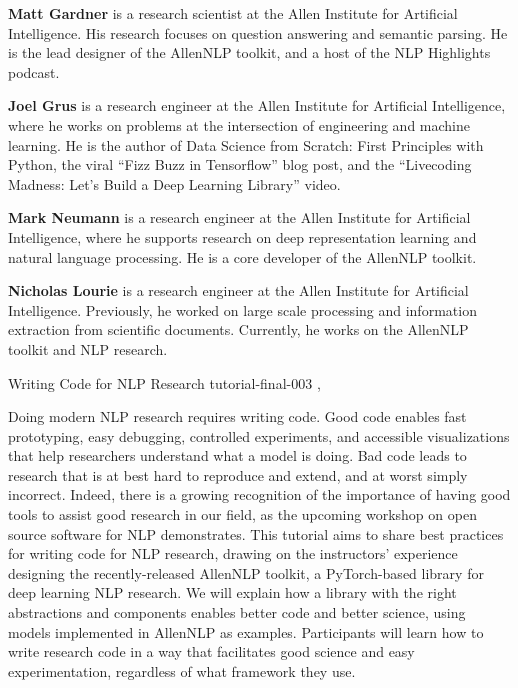 \begin{bio}
\textbf{Matt Gardner} is a research scientist at the Allen
Institute for Artificial Intelligence. His research
focuses on question answering and semantic parsing.
He is the lead designer of the AllenNLP
toolkit, and a host of the NLP Highlights podcast.

\textbf{Joel Grus} is a research engineer at the Allen Institute for Artificial Intelligence, where he works
on problems at the intersection of engineering and
machine learning. He is the author of Data Science
from Scratch: First Principles with Python,
the viral ``Fizz Buzz in Tensorflow'' blog post,
and the ``Livecoding Madness: Let's Build a Deep
Learning Library'' video.

\textbf{Mark Neumann} is a research engineer at the
Allen Institute for Artificial Intelligence, where he
supports research on deep representation learning
and natural language processing. He is a core developer
of the AllenNLP toolkit.

\textbf{Nicholas Lourie} is a research engineer at the
Allen Institute for Artificial Intelligence. Previously,
he worked on large scale processing and
information extraction from scientific documents.
Currently, he works on the AllenNLP toolkit and
NLP research.

\end{bio}

\begin{tutorial}
  {Writing Code for NLP Research}
  {tutorial-final-003}
  {\daydateyear, \tutorialafternoontime}
  {\TutLocC}

Doing modern NLP research requires writing code. Good code enables fast prototyping, easy debugging, controlled experiments, and accessible visualizations that help researchers understand what a model is doing. Bad code leads to research that is at best hard to reproduce and extend, and at worst simply incorrect. Indeed, there is a growing recognition of the importance of having good tools to assist good research in our field, as the upcoming workshop on open source software for NLP demonstrates. This tutorial aims to share best practices for writing code for NLP research, drawing on the instructors' experience designing the recently-released AllenNLP toolkit, a PyTorch-based library for deep learning NLP research. We will explain how a library with the right abstractions and components enables better code and better science, using models implemented in AllenNLP as examples. Participants will learn how to write research code in a way that facilitates good science and easy experimentation, regardless of what framework they use.

\end{tutorial}
